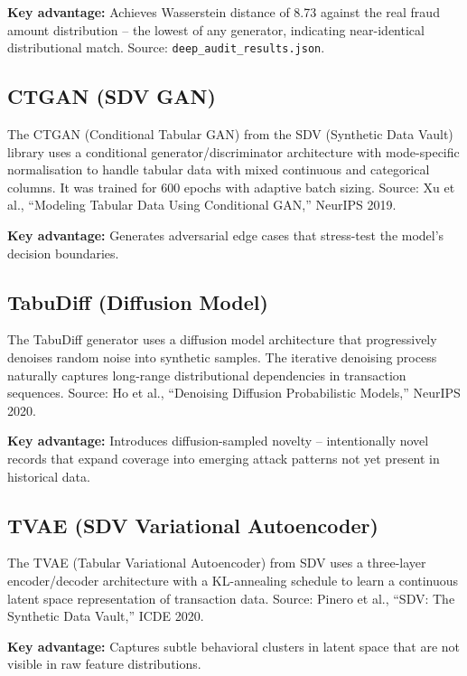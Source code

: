 \documentclass[12pt,a4paper,oneside]{book}
\begin{document}
\textbf{Key advantage:} Achieves Wasserstein distance of 8.73 against the real fraud amount distribution -- the lowest of any generator, indicating near-identical distributional match. Source: \texttt{deep\_audit\_results.json}.

\subsection{CTGAN (SDV GAN)}

The CTGAN (Conditional Tabular GAN) from the SDV (Synthetic Data Vault) library uses a conditional generator/discriminator architecture with mode-specific normalisation to handle tabular data with mixed continuous and categorical columns. It was trained for 600 epochs with adaptive batch sizing. Source: Xu et al., ``Modeling Tabular Data Using Conditional GAN,'' NeurIPS 2019.

\textbf{Key advantage:} Generates adversarial edge cases that stress-test the model's decision boundaries.

\subsection{TabuDiff (Diffusion Model)}

The TabuDiff generator uses a diffusion model architecture that progressively denoises random noise into synthetic samples. The iterative denoising process naturally captures long-range distributional dependencies in transaction sequences. Source: Ho et al., ``Denoising Diffusion Probabilistic Models,'' NeurIPS 2020.

\textbf{Key advantage:} Introduces diffusion-sampled novelty -- intentionally novel records that expand coverage into emerging attack patterns not yet present in historical data.

\subsection{TVAE (SDV Variational Autoencoder)}

The TVAE (Tabular Variational Autoencoder) from SDV uses a three-layer encoder/decoder architecture with a KL-annealing schedule to learn a continuous latent space representation of transaction data. Source: Pinero et al., ``SDV: The Synthetic Data Vault,'' ICDE 2020.

\textbf{Key advantage:} Captures subtle behavioral clusters in latent space that are not visible in raw feature distributions.
\end{document}
